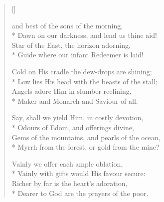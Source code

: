 \newHymn


\begin{verse}[\versewidth]
\begin{altverse}
 and best of the sons of the morning,\\*
Dawn on our darkness, and lend us thine aid!\\
Star of the East, the horizon adorning,\\*
Guide where our infant Redeemer is laid!
\end{altverse}

\begin{altverse}
Cold on His cradle the dew-drops are shining;\\*
Low lies His head with the beasts of the stall;\\
Angels adore Him in slumber reclining,\\*
Maker and Monarch and Saviour of all.
\end{altverse}

\begin{altverse}
Say, shall we yield Him, in costly devotion,\\*
Odours of Edom, and offerings divine,\\
Gems of the mountains, and pearls of the ocean,\\*
Myrrh from the forest, or gold from the mine?
\end{altverse}

\begin{altverse}
Vainly we offer each ample oblation,\\*
Vainly with gifts would His favour secure:\\
Richer by far is the heart's adoration,\\*
Dearer to God are the prayers of the poor.
\end{altverse}

\end{verse}



